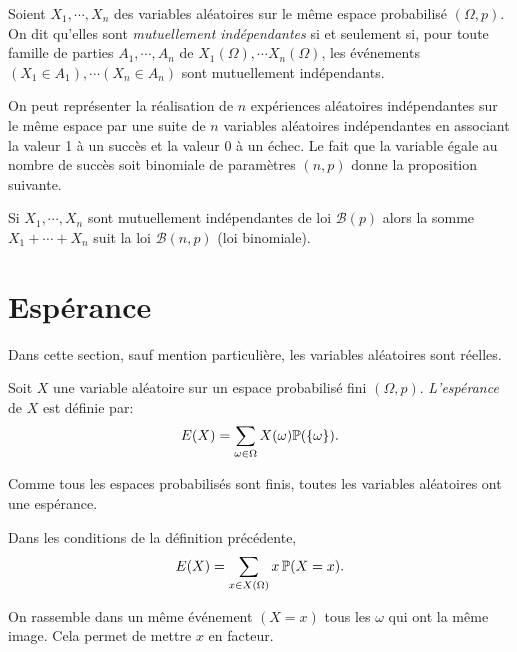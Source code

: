 \begin{defi}
 Soient $X_1,\cdots, X_n$ des variables aléatoires sur le même espace probabilisé $(\Omega,p)$. On dit qu'elles sont \emph{mutuellement indépendantes} si et seulement si, pour toute famille de parties $A_1,\cdots,A_n$ de $X_1(\Omega),\cdots X_n(\Omega)$, les événements $(X_1\in A_1), \cdots (X_n\in A_n)$ sont mutuellement indépendants.
\end{defi}
On peut représenter la réalisation de $n$ expériences aléatoires indépendantes sur le même espace par une suite de $n$ variables aléatoires indépendantes en associant la valeur 1 à un succès et la valeur 0 à un échec. Le fait que la variable égale au nombre de succès soit binomiale de paramètres $(n,p)$ donne la proposition suivante.
\begin{prop}
 Si $X_1, \cdots, X_n$ sont mutuellement indépendantes de loi $\mathcal{B}(p)$ alors la somme $X_1+\cdots+X_n$ suit la loi $\mathcal{B}(n,p)$ (loi binomiale).
\end{prop}

\section{Espérance}
 Dans cette section, sauf mention particulière, les variables aléatoires sont réelles.
\begin{defi}
 Soit $X$ une variable aléatoire sur un espace probabilisé fini $(\Omega,p)$. \emph{L'espérance} de $X$ est définie par:
\begin{displaymath}
 E(X) = \sum_{\omega \in \Omega}X(\omega)\mathbb{P}(\{\omega\}). 
\end{displaymath}
\end{defi}
\begin{rem}
  Comme tous les espaces probabilisés sont finis, toutes les variables aléatoires ont une espérance.
\end{rem}

\begin{prop} Dans les conditions de la définition précédente,
\[
 E(X) = \sum_{x\in X(\Omega)}x\,\mathbb{P}(X=x).
\]
\end{prop}
\begin{demo}
 On rassemble dans un même événement $(X=x)$ tous les $\omega$ qui ont la même image. Cela permet de mettre $x$ en facteur.
\end{demo}

